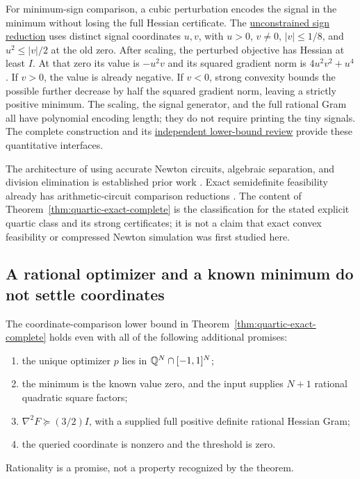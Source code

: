 For minimum-sign comparison, a cubic perturbation encodes the signal
in the minimum without losing the full Hessian certificate. The
\href{../../research-20260927/unconstrained-quartic-posslp-reduction.md}{unconstrained sign reduction}
uses distinct signal coordinates $u,v$, with $u>0$, $v\ne0$,
$|v|\le1/8$, and $u^2\le|v|/2$ at the old zero. After scaling,
the perturbed objective has Hessian at least $I$. At that zero its
value is $-u^2v$ and its squared gradient norm is
$4u^2v^2+u^4$. If $v>0$, the value is already negative. If $v<0$,
strong convexity bounds the possible further decrease by half the
squared gradient norm, leaving a strictly positive minimum. The
scaling, the signal generator, and the full rational Gram all have
polynomial encoding length; they do not require printing the tiny
signals. The complete construction and its
\href{../reviews/exact-core/lower-review.md}{independent lower-bound review}
provide these quantitative interfaces.

The architecture of using accurate Newton circuits, algebraic
separation, and division elimination is established prior work
\citep{AllenderEtAl2009,EtessamiStewartYannakakis2012}. Exact semidefinite feasibility already has
arithmetic-circuit comparison reductions \citep{TarasovVyalyi2008}. The content
of Theorem~\ref{thm:quartic-exact-complete} is the classification for
the stated explicit quartic class and its strong certificates; it is
not a claim that exact convex feasibility or compressed Newton
simulation was first studied here.

\subsection{A rational optimizer and a known minimum do not settle coordinates}

\begin{theorem}
\label{thm:rational-optimizer}
The coordinate-comparison lower bound in
Theorem~\ref{thm:quartic-exact-complete} holds even with all of the
following additional promises:
\begin{enumerate}[label=(\roman*)]
\item the unique optimizer $p$ lies in $\mathbb Q^N\cap[-1,1]^N$;
\item the minimum is the known value zero, and the input supplies
$N+1$ rational quadratic square factors;
\item $\nabla^2F\succeq(3/2)I$, with a supplied full positive
definite rational Hessian Gram;
\item the queried coordinate is nonzero and the threshold is zero.
\end{enumerate}
Rationality is a promise, not a property recognized by the theorem.
\end{theorem}

